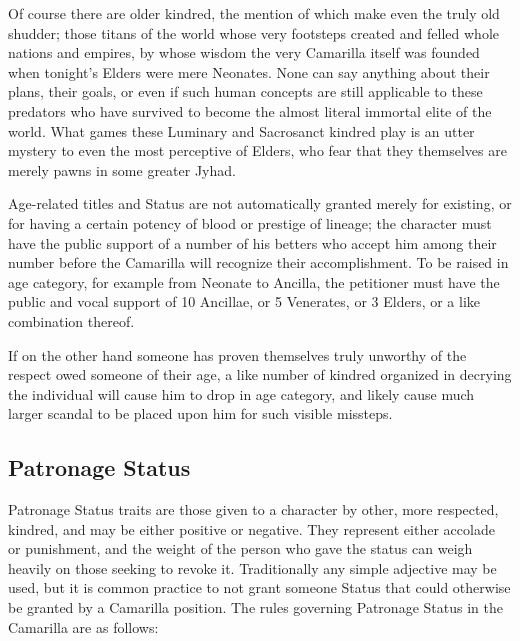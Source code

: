 Of course there are older kindred, the mention of which make even the truly old shudder; those titans 
of the world whose very footsteps created and felled whole nations and empires, by whose wisdom the 
very Camarilla itself was founded when tonight's Elders were mere Neonates.  None can say anything 
about their plans, their goals, or even if such human concepts are still applicable to these predators 
who have survived to become the almost literal immortal elite of the world.  What games these Luminary 
and Sacrosanct kindred play is an utter mystery to even the most perceptive of Elders, who fear that 
they themselves are merely pawns in some greater Jyhad.

Age-related titles and Status are not automatically granted merely for existing, or for having a 
certain potency of blood or prestige of lineage; the character must have the public support of a 
number of his betters who accept him among their number before the Camarilla will recognize their 
accomplishment.  To be raised in age category, for example from Neonate to Ancilla, the petitioner 
must have the public and vocal support of 10 Ancillae, or 5 Venerates, or 3 Elders, or a like 
combination thereof.  

If on the other hand someone has proven themselves truly unworthy of the respect owed someone of their 
age, a like number of kindred organized in decrying the individual will cause him to drop in age 
category, and likely cause much larger scandal to be placed upon him for such visible missteps.

\subsection{Patronage Status}

Patronage Status traits are those given to a character by other, more respected, kindred, and may be 
either positive or negative.  They represent either accolade or punishment, and the weight of the 
person who gave the status can weigh heavily on those seeking to revoke it.  Traditionally any simple 
adjective may be used, but it is common practice to not grant someone Status that could otherwise be 
granted by a Camarilla position. The rules governing Patronage Status in the Camarilla are as follows: 

